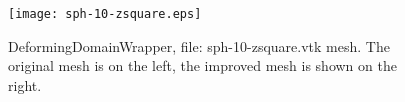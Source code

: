 \begin{figure}[htbp]
\begin{center}
    \texttt{[image: sph-10-zsquare.eps]}
    \caption{DeformingDomainWrapper, file: sph-10-zsquare.vtk mesh. The original mesh is on the left, the improved mesh is shown on the right.}
    \label{fig:sph-10-zsquare}
\end{center}
\end{figure}
